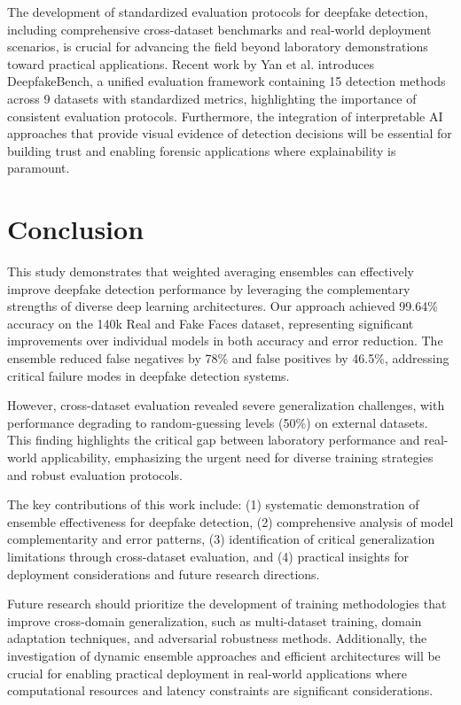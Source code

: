 \documentclass[conference]{IEEEtran}
\begin{document}
The development of standardized evaluation protocols for deepfake detection, including comprehensive cross-dataset benchmarks and real-world deployment scenarios, is crucial for advancing the field beyond laboratory demonstrations toward practical applications. Recent work by Yan et al. \cite{yan2023deepfakebench} introduces DeepfakeBench, a unified evaluation framework containing 15 detection methods across 9 datasets with standardized metrics, highlighting the importance of consistent evaluation protocols. Furthermore, the integration of interpretable AI approaches \cite{du2024taenet} that provide visual evidence of detection decisions will be essential for building trust and enabling forensic applications where explainability is paramount.

\section{Conclusion}

This study demonstrates that weighted averaging ensembles can effectively improve deepfake detection performance by leveraging the complementary strengths of diverse deep learning architectures. Our approach achieved 99.64\% accuracy on the 140k Real and Fake Faces dataset, representing significant improvements over individual models in both accuracy and error reduction. The ensemble reduced false negatives by 78\% and false positives by 46.5\%, addressing critical failure modes in deepfake detection systems.

However, cross-dataset evaluation revealed severe generalization challenges, with performance degrading to random-guessing levels (50\%) on external datasets. This finding highlights the critical gap between laboratory performance and real-world applicability, emphasizing the urgent need for diverse training strategies and robust evaluation protocols.

The key contributions of this work include: (1) systematic demonstration of ensemble effectiveness for deepfake detection, (2) comprehensive analysis of model complementarity and error patterns, (3) identification of critical generalization limitations through cross-dataset evaluation, and (4) practical insights for deployment considerations and future research directions.

Future research should prioritize the development of training methodologies that improve cross-domain generalization, such as multi-dataset training, domain adaptation techniques, and adversarial robustness methods. Additionally, the investigation of dynamic ensemble approaches and efficient architectures will be crucial for enabling practical deployment in real-world applications where computational resources and latency constraints are significant considerations.
\end{document}
